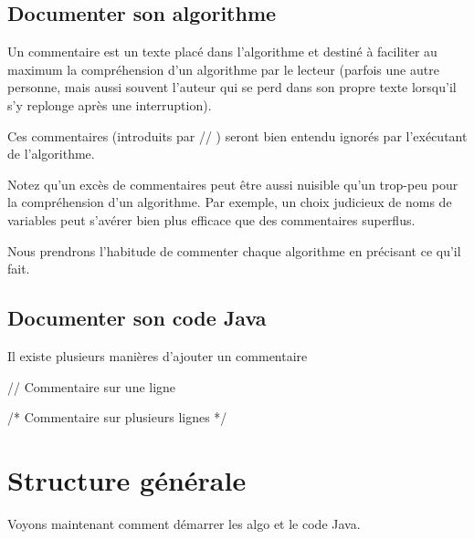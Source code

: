 \documentclass[11pt,a4paper]{article}
\begin{document}
            \par
        \subsection{Documenter son algorithme}
        Un commentaire est un texte plac\'e dans l'algorithme et destin\'e \`a faciliter au maximum 
        la compr\'ehension d'un algorithme par le lecteur (parfois une autre personne, 
        mais aussi souvent l'auteur qui se perd dans son propre texte lorsqu'il s'y replonge apr\`es une interruption). 
      
            \par
        
        Ces commentaires (introduits par \guillemotleft  // \guillemotright ) seront bien entendu ignor\'es par l'ex\'ecutant de l'algorithme.
      
            \par
        
        Notez qu'un exc\`es de commentaires peut \^etre aussi nuisible qu'un trop-peu pour la 
        compr\'ehension d'un algorithme. 
        Par exemple, un choix judicieux de noms de variables peut s'av\'erer bien plus efficace que des commentaires superflus.
      
            \par
        
        Nous prendrons l'habitude de commenter chaque algorithme en pr\'ecisant ce qu'il fait.
      
            \par
        \subsection{Documenter son code Java}Il existe plusieurs mani\`eres d'ajouter un commentaire
            \par
        \begin{Java}
// Commentaire sur une ligne
\end{Java}\begin{Java}
/* Commentaire sur
  plusieurs lignes */
\end{Java}\section{Structure g\'en\'erale}
				Voyons maintenant comment d\'emarrer les algo et le code Java.
      
            \par
\end{document}

